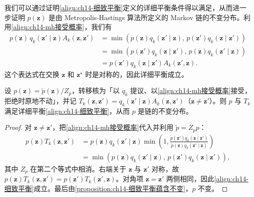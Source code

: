 \documentclass[../../main.tex]{subfiles}
\begin{document}
我们可以通过证明\eqref{align:ch14-细致平衡}定义的详细平衡条件得以满足，从而进一步证明 $p(\bm{z})$ 是由 Metropolis-Hastings 算法所定义的 Markov 链的不变分布。利用\eqref{align:ch14-mh接受概率}，我们有
\begin{align}
p(\bm{z})\,q_{k}\!\left(\bm{z}'\mid\bm{z}\right)A_{k}\!\left(\bm{z},\bm{z}'\right)&=\min\left(p(\bm{z})q_{k}\!\left(\bm{z}'\mid\bm{z}\right),\,p\!\left(\bm{z}'\right)q_{k}\!\left(\bm{z}\mid\bm{z}'\right)\right)\nonumber\\
&=\min\left(p\!\left(\bm{z}'\right)q_{k}\!\left(\bm{z}\mid\bm{z}'\right),\,p(\bm{z})q_{k}\!\left(\bm{z}'\mid\bm{z}\right)\right)\nonumber\\
&=p\!\left(\bm{z}'\right)q_{k}\!\left(\bm{z}\mid\bm{z}'\right)A_{k}\!\left(\bm{z}',\bm{z}\right).
\label{align:ch14-mh细致平衡}
\end{align}
这个表达式在交换 $\bm{z}$ 和 $\bm{z}^{\star}$ 时是对称的，因此详细平衡成立。

\begin{proposition}\label{proposition:ch14-mh细致平衡}
设 $p(\bm{z})=\widetilde{p}(\bm{z})/Z_{p}$，转移核为「以 $q_{k}$ 提议、以\eqref{align:ch14-mh接受概率}接受，拒绝时原地不动」，并记 $T_{k}\!\left(\bm{z},\bm{z}'\right)=q_{k}\!\left(\bm{z}'\mid\bm{z}\right)A_{k}\!\left(\bm{z},\bm{z}'\right)$（$\bm{z}\neq\bm{z}'$）。则 $p$ 与 $T_{k}$ 满足详细平衡\eqref{align:ch14-细致平衡}，从而 $p$ 是链的不变分布。
\end{proposition}

\begin{proof}
对 $\bm{z}\neq\bm{z}'$，把\eqref{align:ch14-mh接受概率}代入并利用 $\widetilde{p}=Z_{p}p$：
\begin{align*}
p(\bm{z})T_{k}\!\left(\bm{z},\bm{z}'\right)&=p(\bm{z})q_{k}\!\left(\bm{z}'\mid\bm{z}\right)\min\left(1,\frac{\widetilde{p}\!\left(\bm{z}'\right)q_{k}\!\left(\bm{z}\mid\bm{z}'\right)}{\widetilde{p}(\bm{z})q_{k}\!\left(\bm{z}'\mid\bm{z}\right)}\right)\\
&=\min\left(p(\bm{z})q_{k}\!\left(\bm{z}'\mid\bm{z}\right),\,p\!\left(\bm{z}'\right)q_{k}\!\left(\bm{z}\mid\bm{z}'\right)\right),
\end{align*}
其中 $Z_{p}$ 在第二个等式中相消。右端关于 $\bm{z}$ 与 $\bm{z}'$ 对称，故 $p(\bm{z})T_{k}\!\left(\bm{z},\bm{z}'\right)=p\!\left(\bm{z}'\right)T_{k}\!\left(\bm{z}',\bm{z}\right)$。对角项 $\bm{z}=\bm{z}'$ 两侧相同，因此\eqref{align:ch14-细致平衡}成立。最后由\cref{proposition:ch14-细致平衡蕴含不变}，$p$ 不变。
\end{proof}
\end{document}
